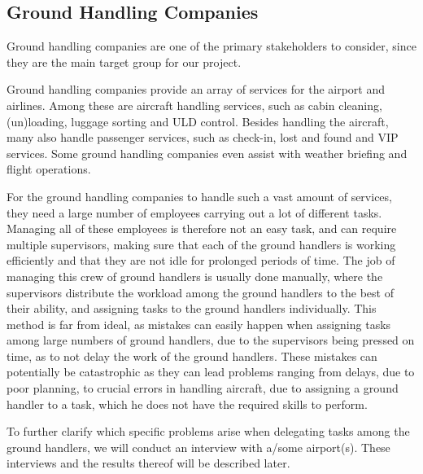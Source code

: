 \subsection{Ground Handling Companies}
Ground handling companies are one of the primary stakeholders to consider, since they are the main target group for our project.

Ground handling companies provide an array of services for the airport and airlines. Among these are aircraft handling services, such as cabin cleaning, (un)loading, luggage sorting and ULD control. Besides handling the aircraft, many also handle passenger services, such as check-in, lost and found and VIP services. Some ground handling companies even assist with weather briefing and flight operations.

For the ground handling companies to handle such a vast amount of services, they need a large number of employees carrying out a lot of different tasks. Managing all of these employees is therefore not an easy task, and can require multiple supervisors, making sure that each of the ground handlers is working efficiently and that they are not idle for prolonged periods of time. The job of managing this crew of ground handlers is usually done manually, where the supervisors distribute the workload among the ground handlers to the best of their ability, and assigning tasks to the ground handlers individually.
This method is far from ideal, as mistakes can easily happen when assigning tasks among large numbers of ground handlers, due to the supervisors being pressed on time, as to not delay the work of the ground handlers. These mistakes can potentially be catastrophic as they can lead problems ranging from delays, due to poor planning, to crucial errors in handling aircraft, due to assigning a ground handler to a task, which he does not have the required skills to perform.

To further clarify which specific problems arise when delegating tasks among the ground handlers, we will conduct an interview with a/some airport(s). These interviews and the results thereof will be described later.